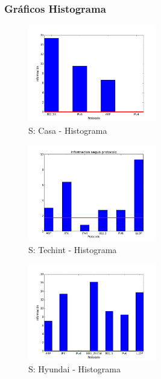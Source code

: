 \documentclass[final,narroweqnarray,inline]{ieee}
\begin{document}
  \subsubsection*{Gráficos Histograma}
    \begin{figure}[ht]\begin{center}
      \includegraphics[width=0.5\textwidth]{../output/marto-casa-3hs-s-histogram.png}
      \caption{S: Casa - Histograma}
      \label{marto-casa-3hs-s-histogram}
    \end{center}\end{figure}
    \begin{figure}[ht]\begin{center}
      \includegraphics[width=0.5\textwidth]{../output/techint-s-histogram.png}
      \caption{S: Techint - Histograma}
      \label{techint-s-histogram}
    \end{center}\end{figure}
    \begin{figure}[ht]\begin{center}
      \includegraphics[width=0.5\textwidth]{../output/hyundai-s-histogram.png}
      \caption{S: Hyundai - Histograma}
      \label{hyundai-s-histogram}
    \end{center}\end{figure}
\end{document}
